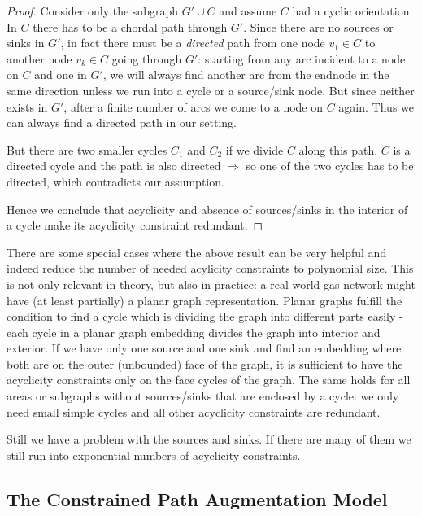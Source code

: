 \begin{proof}
 Consider only the subgraph $G'\cup C$ and assume $C$ had a cyclic orientation. In $C$ there has to be a chordal path 
through $G'$. Since there are no sources or sinks in $G'$, in fact there must be a \textit{directed} path from one node 
$v_1 \in C$ to another node $v_k\in C$ going through $G'$: starting from any arc incident to a node on $C$ and one in 
$G'$, we will always find another arc from the endnode in the same direction unless we run into a cycle or a 
source/sink node. But since neither exists in $G'$, after a finite number of arcs we come to a node on $C$ again. Thus 
we can always find a directed path in our setting. 

But there are two smaller cycles $C_1$ and $C_2$ if we divide $C$ along this path. $C$ is a directed cycle and the path 
is also directed $\Rightarrow$ so one of the two cycles has to be directed, which contradicts our assumption. 
\Lightning 

Hence we conclude that acyclicity and absence of sources/sinks in the interior of a cycle make its acyclicity 
constraint redundant.
\end{proof}

There are some special cases where the above result can be very helpful and indeed reduce the number of needed 
acylicity constraints to polynomial size. This is not only relevant in theory, but also in practice: a real world gas 
network might have (at least partially) a planar graph representation. Planar graphs fulfill the condition to find a 
cycle which is dividing the graph into different parts easily - each cycle in a planar graph embedding divides the 
graph 
into interior and exterior. If we have only one source and one sink and find an embedding where both are on the outer 
(unbounded) face of the graph, it is sufficient to have the acyclicity constraints only on the face cycles of the 
graph. The same holds for all areas or subgraphs without sources/sinks that are enclosed by a cycle: we only need small 
simple cycles and all other acyclicity constraints are redundant.

Still we have a problem with the sources and sinks. If there are many of them we still run into exponential numbers of 
acyclicity constraints.

\newpage
\subsection{The Constrained Path Augmentation Model}%

